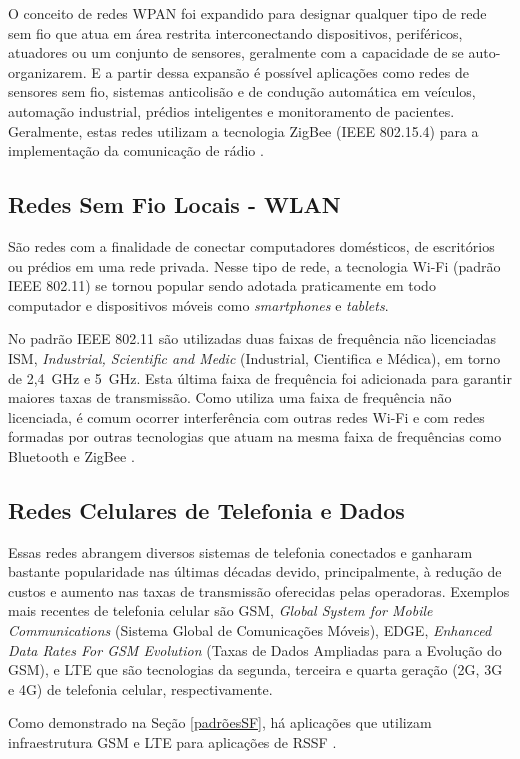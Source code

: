 O conceito de redes WPAN foi expandido para designar qualquer tipo de rede sem fio que atua em área restrita interconectando dispositivos, periféricos, atuadores ou um conjunto de sensores, geralmente com a capacidade de se auto-organizarem. E a partir dessa expansão é possível aplicações como redes de sensores sem fio, sistemas anticolisão e de condução automática em veículos, automação industrial, prédios inteligentes e monitoramento de pacientes. Geralmente, estas redes utilizam a tecnologia ZigBee (IEEE 802.15.4) para a implementação da comunicação de rádio \cite{rochol2018sistemas}.

\subsection{Redes Sem Fio Locais - WLAN}
São redes com a finalidade de conectar computadores domésticos, de escritórios ou prédios em uma rede privada. Nesse tipo de rede, a tecnologia Wi-Fi (padrão IEEE 802.11) se tornou popular sendo adotada praticamente em todo computador e dispositivos móveis como \emph{smartphones} e \emph{tablets}.

No padrão IEEE 802.11 são utilizadas duas faixas de frequência não licenciadas ISM, \emph{Industrial, Scientific and Medic} (Industrial, Cientifica e Médica), em torno de 2,4~GHz e 5~GHz. Esta última faixa de frequência foi adicionada para garantir maiores taxas de transmissão. Como utiliza uma faixa de frequência não licenciada, é comum ocorrer interferência com outras redes Wi-Fi e com redes formadas por outras tecnologias que atuam na mesma faixa de frequências como Bluetooth e ZigBee \cite{rochol2018sistemas}.

\subsection{Redes Celulares de Telefonia e Dados}
Essas redes abrangem diversos sistemas de telefonia conectados e ganharam bastante popularidade nas últimas décadas devido, principalmente, à redução de custos e aumento nas taxas de transmissão oferecidas pelas operadoras. Exemplos mais recentes de telefonia celular são GSM, \emph{Global System for Mobile Communications} (Sistema Global de Comunicações Móveis), EDGE, \emph{Enhanced Data Rates For GSM Evolution} (Taxas de Dados Ampliadas para a Evolução do GSM), e LTE que são tecnologias da segunda, terceira e quarta geração (2G, 3G e 4G) de telefonia celular, respectivamente.

Como demonstrado na Seção \ref{padrõesSF}, há aplicações que utilizam infraestrutura GSM e LTE para aplicações de RSSF \cite{rochol2018sistemas}.


